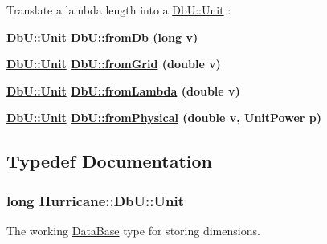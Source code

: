 Translate a lambda length into a \hyperlink{group__DbUGroup_ga4fbfa3e8c89347af76c9628ea06c4146}{Db\-U\-::\-Unit} \-: 
\begin{DoxyItemize}
\item {\bfseries \hyperlink{group__DbUGroup_ga4fbfa3e8c89347af76c9628ea06c4146}{Db\-U\-::\-Unit} \hyperlink{group__DbUGroup_gaec69d65ec1651c2feea24c5931f4580b}{Db\-U\-::from\-Db} (long v)} 
\item {\bfseries \hyperlink{group__DbUGroup_ga4fbfa3e8c89347af76c9628ea06c4146}{Db\-U\-::\-Unit} \hyperlink{group__DbUGroup_ga367e1d1b5ac1df076745550cba8a83c1}{Db\-U\-::from\-Grid} (double v)} 
\item {\bfseries \hyperlink{group__DbUGroup_ga4fbfa3e8c89347af76c9628ea06c4146}{Db\-U\-::\-Unit} \hyperlink{group__DbUGroup_ga4b570755b19ea9ff0f2f258a221bd935}{Db\-U\-::from\-Lambda} (double v)} 
\item {\bfseries \hyperlink{group__DbUGroup_ga4fbfa3e8c89347af76c9628ea06c4146}{Db\-U\-::\-Unit} \hyperlink{group__DbUGroup_ga11d4dbd9134a19bda35cbacde1cb2769}{Db\-U\-::from\-Physical} (double v, Unit\-Power p)} 
\end{DoxyItemize}

\subsection{Typedef Documentation}
\hypertarget{group__DbUGroup_ga4fbfa3e8c89347af76c9628ea06c4146}{
\subsubsection[{Unit}]{\setlength{\rightskip}{0pt plus 5cm}long {\bf Hurricane\-::\-Db\-U\-::\-Unit}}}\label{group__DbUGroup_ga4fbfa3e8c89347af76c9628ea06c4146}
The working \hyperlink{classHurricane_1_1DataBase}{Data\-Base} type for storing dimensions. 

